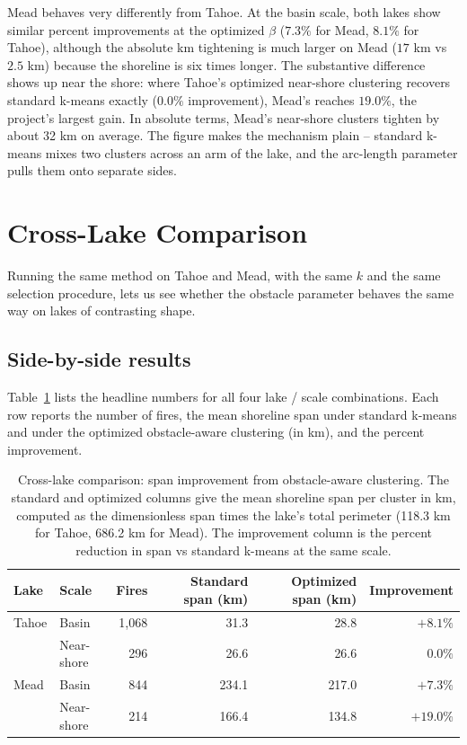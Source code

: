 \documentclass[11pt]{article}
\begin{document}
Mead behaves very differently from Tahoe. At the basin scale, both lakes show similar percent improvements at the optimized $\beta$ ($7.3\%$ for Mead, $8.1\%$ for Tahoe), although the absolute km tightening is much larger on Mead ($17$ km vs $2.5$ km) because the shoreline is six times longer. The substantive difference shows up near the shore: where Tahoe's optimized near-shore clustering recovers standard k-means exactly ($0.0\%$ improvement), Mead's reaches $19.0\%$, the project's largest gain. In absolute terms, Mead's near-shore clusters tighten by about 32 km on average. The figure makes the mechanism plain -- standard k-means mixes two clusters across an arm of the lake,  and the arc-length parameter pulls them onto separate sides. 

\section{Cross-Lake Comparison}
\label{sec:cross-lake}
 
Running the same method on Tahoe and Mead, with the same $k$ and the same selection procedure, lets us see whether the obstacle parameter behaves the same way on lakes of contrasting shape.
 
\subsection{Side-by-side results}
 
Table~\ref{tab:cross-lake} lists the headline numbers for all four lake / scale combinations. Each row reports the number of fires, the mean shoreline span under standard k-means and under the optimized obstacle-aware clustering (in km), and the percent improvement.
 
\begin{table}[H]
\centering
\caption{Cross-lake comparison: span improvement from obstacle-aware clustering. The standard and optimized columns give the mean shoreline span per cluster in km, computed as the dimensionless span times the lake's total perimeter (118.3 km for Tahoe, 686.2 km for Mead). The improvement column is the percent reduction in span vs standard k-means at the same scale.}
\label{tab:cross-lake}
\begin{tabular}{llrrrr}
\toprule
Lake & Scale & Fires & Standard span (km) & Optimized span (km) & Improvement \\
\midrule
\multirow{-1}{*}{Tahoe}
  & Basin      & 1{,}068 & 31.3  & 28.8  & $+8.1\%$  \\
  & Near-shore &   296   & 26.6  & 26.6  & $\phantom{+}0.0\%$ \\
\midrule
\multirow{-1}{*}{Mead}
  & Basin      &   844   & 234.1 & 217.0 & $+7.3\%$  \\
  & Near-shore &   214   & 166.4 & 134.8 & $+19.0\%$ \\
\bottomrule
\end{tabular}
\end{table}
 
\end{document}
